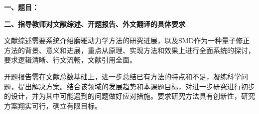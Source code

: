 {
    \setlength{\parindent}{0em}
    \vspace{0.5em}
    \par {\bfseries 一、题目：\hfill \Title \hfill} \\
    \par {\bfseries 二、指导教师对文献综述、开题报告、外文翻译的具体要求}
}

文献综述需要系统介绍磨雅动力学方法的研究进展，以及SMD作为一种量子修正方法的背景、意义和进展，重点从原理、实现方法和效果上进行全面系统的探讨，要求逻辑清晰、行文流畅，文献引用全面。

开题报告需在文献总数基础上，进一步总结已有方法的特点和不足，凝练科学问题，提出解决方案。结合该领域的发展趋势和本课题目标，对进一步研究进行初步的设计，并为其中可能遇到的问题做好应对措施。要求研究方法具有创新性，研究方案翔实可行，确立有限目标。
 \vfill

\signature{指导教师（签名）}
